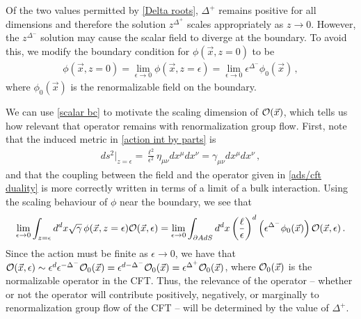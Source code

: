 \documentclass[../PhD.tex]{subfiles}
\begin{document}
Of the two values permitted by \eqref{Delta roots}, $\Delta^+$ remains positive for all dimensions and therefore the solution $z^{\Delta^+}$ scales appropriately as $z \to 0$. However, the $z^{\Delta^-}$ solution may cause the scalar field to diverge at the boundary. To avoid this, we modify the boundary condition for $\phi(\vec x, z=0)$ to be
\begin{align}
\label{scalar bc}
\phi(\vec x, z=0) = \lim_{\epsilon \to 0} \phi(\vec x, z=\epsilon) = \lim_{\epsilon \to 0} \epsilon^{\Delta^-} \phi_0 (\vec x) \, ,
\end{align}
where $\phi_0 (\vec x)$ is the renormalizable field on the boundary. 

We can use \eqref{scalar bc} to motivate the scaling dimension of $\mathcal O (\vec x)$, which tells us how relevant that operator remains with renormalization group flow. First, note that the induced metric in \eqref{action int by parts} is
\begin{align}
ds^2 \Big|_{z=\epsilon} = \frac{\ell^2}{\epsilon^2} \eta_{\mu \nu} dx^\mu dx^\nu = \gamma_{\mu \nu} dx^\mu dx^\nu \, ,
\end{align}
and that the coupling between the field and the operator given in \eqref{ads/cft duality} is more correctly written in terms of a limit of a bulk interaction. Using the scaling behaviour of $\phi$ near the boundary, we see that
\begin{align}
\lim_{\epsilon \to 0} \int_{z=\epsilon} d^{d}x \sqrt{\gamma} \, \phi(\vec x, z = \epsilon) \mathcal O(\vec x, \epsilon) = \lim_{\epsilon \to 0} \int_{\partial AdS} d^d x \left(\frac{\ell}{\epsilon}\right)^d \left( \epsilon^{\Delta^-} \phi_0 (\vec x) \right) \mathcal O (\vec x, \epsilon) \, .
\end{align}
Since the action must be finite as $\epsilon \to 0$, we have that $ \mathcal O(\vec x, \epsilon) \sim \epsilon^{d} \epsilon^{-\Delta^-} \mathcal O_0 (\vec x) = \epsilon^{d - \Delta^-} \mathcal O_0 (\vec x) = \epsilon^{\Delta^+} \mathcal O_0 (\vec x)$, where $\mathcal O_0(\vec x)$ is the normalizable operator in the CFT. Thus, the relevance of the operator -- whether or not the operator will contribute positively, negatively, or marginally to renormalization group flow of the CFT \cite{0908.0333} -- will be determined by the value of $\Delta^+$.
\end{document}
